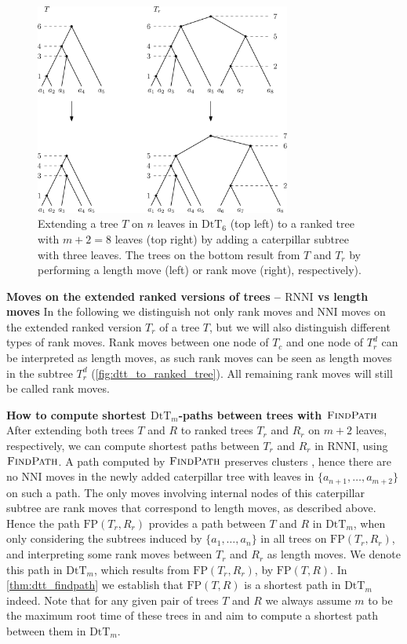 \documentclass[11pt]{amsart}
\newcommand{\rnni}{\mathrm{RNNI}}
\newcommand{\findpath}{\textsc{FindPath}}
\newcommand{\nni}{\mathrm{NNI}}
\newcommand{\fp}{\mathrm{FP}}
\newcommand{\dtt}{\mathrm{DtT}}
\newcommand{\summary}[1]{\textbf{#1}} %
\begin{document}
\begin{figure}[ht]
	\includegraphics[width=0.75\textwidth]{dtt_to_ranked_tree.eps}
	\caption{Extending a tree $T$ on $n$ leaves in $\dtt_6$ (top left) to a ranked tree with $m+2=8$ leaves (top right) by adding a caterpillar subtree with three leaves.
	The trees on the bottom result from $T$ and $T_r$ by performing a length move (left) or rank move (right), respectively).}
	\label{fig:dtt_to_ranked_tree}
\end{figure}

\summary{Moves on the extended ranked versions of trees -- $\rnni$ vs length moves}
In the following we distinguish not only rank moves and $\nni$ moves on the extended ranked version $T_r$ of a tree $T$, but we will also distinguish different types of rank moves.
Rank moves between one node of $T_c$ and one node of $T_r^d$ can be interpreted as length moves, as such rank moves can be seen as length moves in the subtree $T_r^d$ (\autoref{fig:dtt_to_ranked_tree}).
All remaining rank moves will still be called rank moves.

\summary{How to compute shortest $\dtt_m$-paths between trees with $\findpath$}
After extending both trees $T$ and $R$ to ranked trees $T_r$ and $R_r$ on $m+2$ leaves, respectively, we can compute shortest paths between $T_r$ and $R_r$ in $\rnni$, using $\findpath$.
A path computed by $\findpath$ preserves clusters \autocite{Collienne2020-iu}, hence there are no $\nni$ moves in the newly added caterpillar tree with leaves in $\{a_{n+1}, \ldots, a_{m+2}\}$ on such a path.
The only moves involving internal nodes of this caterpillar subtree are rank moves that correspond to length moves, as described above.
Hence the path $\fp(T_r,R_r)$ provides a path between $T$ and $R$ in $\dtt_m$, when only considering the subtrees induced by $\{a_1, \ldots, a_n\}$ in all trees on $\fp(T_r, R_r)$, and interpreting some rank moves between $T_r$ and $R_r$ as length moves.
We denote this path in $\dtt_m$, which results from $\fp(T_r, R_r)$, by $\fp(T,R)$.
In \autoref{thm:dtt_findpath} we establish that $\fp(T,R)$ is a shortest path in $\dtt_m$ indeed.
Note that for any given pair of trees $T$ and $R$ we always assume $m$ to be the maximum root time of these trees in and aim to compute a shortest path between them in $\dtt_m$. 
\end{document}
